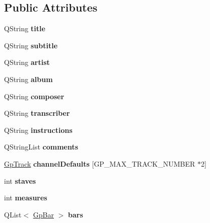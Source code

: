 \subsection*{Public Attributes}
\begin{DoxyCompactItemize}
\item 
\mbox{\label{class_ms_1_1_guitar_pro_a3b2c966c0e26802b6613b1d29d2b1419}} 
Q\+String {\bfseries title}
\item 
\mbox{\label{class_ms_1_1_guitar_pro_ae6ea75e40e90abea2eb4d544b85af0b9}} 
Q\+String {\bfseries subtitle}
\item 
\mbox{\label{class_ms_1_1_guitar_pro_a88e79a3ebad9cd2e39191d61fb3a152f}} 
Q\+String {\bfseries artist}
\item 
\mbox{\label{class_ms_1_1_guitar_pro_a0e024434828a4af780640327ec1f8d66}} 
Q\+String {\bfseries album}
\item 
\mbox{\label{class_ms_1_1_guitar_pro_a202b77bc3e541b286f1e21223890d0a3}} 
Q\+String {\bfseries composer}
\item 
\mbox{\label{class_ms_1_1_guitar_pro_a9c67d551b385d1810fdb559021bd9e7f}} 
Q\+String {\bfseries transcriber}
\item 
\mbox{\label{class_ms_1_1_guitar_pro_a1591c59068db568dc6ce37852ae1e940}} 
Q\+String {\bfseries instructions}
\item 
\mbox{\label{class_ms_1_1_guitar_pro_a0afb23df897da6c88ebb04b0fc38bd59}} 
Q\+String\+List {\bfseries comments}
\item 
\mbox{\label{class_ms_1_1_guitar_pro_a9aeb95f94e9c7afad52dc338c2ec3f1f}} 
\hyperlink{struct_ms_1_1_gp_track}{Gp\+Track} {\bfseries channel\+Defaults} \mbox{[}G\+P\+\_\+\+M\+A\+X\+\_\+\+T\+R\+A\+C\+K\+\_\+\+N\+U\+M\+B\+ER $\ast$2\mbox{]}
\item 
\mbox{\label{class_ms_1_1_guitar_pro_afb6c97e3cae330e192d4cede3f8ad3f3}} 
int {\bfseries staves}
\item 
\mbox{\label{class_ms_1_1_guitar_pro_ad781081707a745e1b9145c62d281c2b0}} 
int {\bfseries measures}
\item 
\mbox{\label{class_ms_1_1_guitar_pro_aad3f695ad44e7b76b67dcfadc288feb4}} 
Q\+List$<$ \hyperlink{struct_ms_1_1_gp_bar}{Gp\+Bar} $>$ {\bfseries bars}
\end{DoxyCompactItemize}
